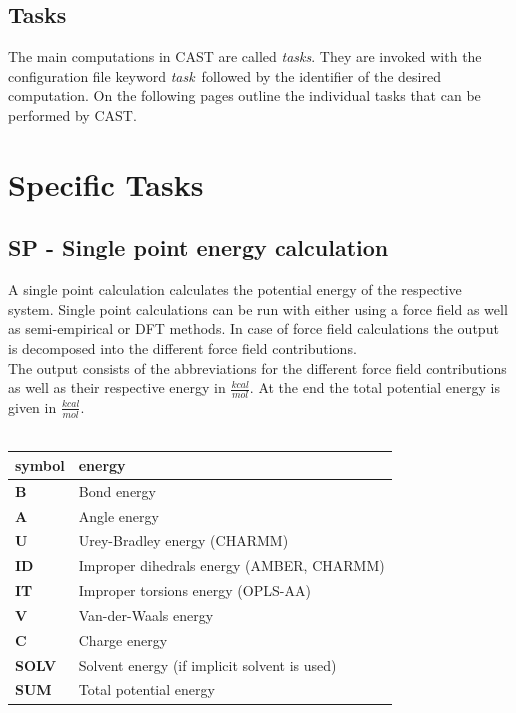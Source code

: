 \documentclass[10pt,a4paper]{article} %
\begin{document}
	
	\subsection{Tasks}
	The main computations in \ac{CAST} are called \textit{tasks}. They are invoked with the configuration file keyword \glqq\textit{task}\grqq~followed by the identifier of the desired computation. On the following pages outline the individual tasks that can be performed by \ac{CAST}.

	\newpage

	\section{Specific Tasks}

	\subsection{SP - Single point energy calculation}
	A single point calculation calculates the potential energy of the respective system. Single point calculations can be run with either using a force field as well as semi-empirical or \ac{DFT} methods. In case of force field calculations the output is decomposed into the different force field contributions.\\

	The output consists of the abbreviations for the different force field contributions as well as their respective energy in $\frac{kcal}{mol}$. At the end the total potential energy is given in $\frac{kcal}{mol}$.\\~\\

	\begin{tabularx}{\textwidth}{l|l}
		symbol & energy\\
		\hline
		\textbf{B} & Bond energy\\
		\textbf{A} & Angle energy\\
		\textbf{U} & Urey-Bradley energy (\ac{CHARMM})\\
		\textbf{ID} & Improper dihedrals energy (\ac{AMBER}, \ac{CHARMM})\\
		\textbf{IT} & Improper torsions energy (\ac{OPLS-AA})\\
		\textbf{V} & Van-der-Waals energy\\
		\textbf{C} & Charge energy\\
		\textbf{SOLV} & Solvent energy (if implicit solvent is used)\\
		\textbf{SUM} & Total potential energy\\

	\end{tabularx}\\~\\
\end{document}
